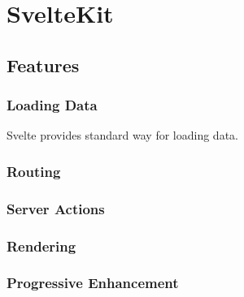 \section{SvelteKit}
\label{sec:sveltekit}


\subsection{Features}

\subsubsection{Loading Data}
\label{sec:sveltekit-loading}

Svelte provides standard way for loading data.

\subsubsection{Routing}

\subsubsection{Server Actions}
\label{sec:sveltekit-server-actions}
 
\subsubsection{Rendering}

\subsubsection{Progressive Enhancement}